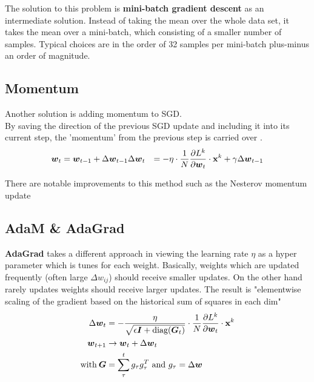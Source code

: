 The solution to this problem is \textbf{mini-batch gradient descent} as an intermediate solution.
Instead of taking the mean over the whole data set, it takes the mean over a mini-batch, which consisting of a smaller number of samples.
Typical choices are in the order of 32 samples per mini-batch plus-minus an order of magnitude.

\subsection{Momentum}
Another solution is adding momentum to SGD.\\
By saving the direction of the previous SGD update and including it into its current step, the 'momentum' from the previous step is carried over \cite{ommer}.
\begin{align}
    \boldsymbol{w}_t & = \boldsymbol{w}_{t-1} + \Delta \boldsymbol{w}_{t-1}
    \Delta \boldsymbol{w}_t & = - \eta \cdot \frac{1}{N} \frac{\partial L^k}{\partial \boldsymbol{w}_t} \cdot \mathbf{x}^k + \gamma \Delta \boldsymbol{w}_{t-1}\\
\end{align}

There are notable improvements to this method such as the Nesterov momentum update \cite{ommer}

\subsection{AdaM \& AdaGrad}
\textbf{AdaGrad} takes a different approach in viewing the learning rate $\eta$ as a hyper parameter which is tunes for each weight.
Basically, weights which are updated frequently (often large $\Delta w_{ij}$) should receive smaller updates.
On the other hand rarely updates weights should receive larger updates.
The result is "elementwise scaling of the gradient based on the historical sum of squares in each dim" \cite{ommer}
\begin{align}
    \Delta \boldsymbol{w}_t & = - \frac{\eta}{\sqrt{\epsilon \boldsymbol{I} + \text{diag}(\boldsymbol{G}_t)}} \cdot \frac{1}{N} \frac{\partial L^k}{\partial \boldsymbol{w}_t} \cdot \mathbf{x}^k \\
    \boldsymbol{w}_{t+1} & \rightarrow \boldsymbol{w}_t + \Delta \boldsymbol{w}_t \\
    \text{with} \: \boldsymbol{G} & = \sum_{\tau}^{t} g_\tau g_\tau^T \text{ and } g_\tau = \Delta \boldsymbol{w}
\end{align}

